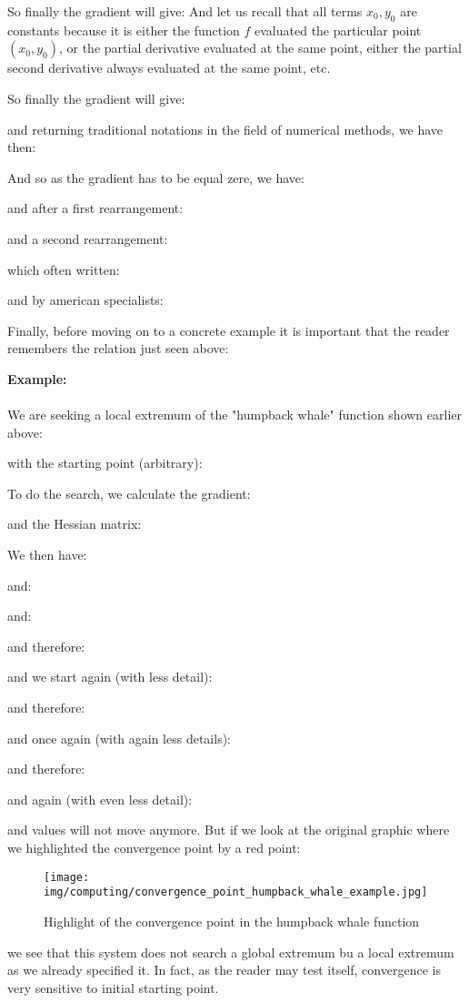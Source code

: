 	So finally the gradient will give:
	And let us recall that all terms $x_0,y_0$ are constants because it is either the function $f$ evaluated the particular point $(x_0,y_0)$, or the partial derivative evaluated at the same point, either the partial second derivative always evaluated at the same point, etc.

	So finally the gradient will give:
	
	and returning traditional notations in the field of numerical methods, we have then:
	
	And so as the gradient has to be equal zere, we have:
	
	and after a first rearrangement:
	
	and a second rearrangement:
	
	which often written:
	
	and by american specialists:
	
	Finally, before moving on to a concrete example it is important that the reader remembers the relation just seen above:
	
	
	\pagebreak
	\begin{tcolorbox}[colframe=black,colback=white,sharp corners]
	\textbf{{\Large {}}Example:}\\\\
	We are seeking a local extremum of the "humpback whale" function shown earlier above:
	
	with the starting point (arbitrary):
	
	To do the search, we calculate the gradient:
	
	and the Hessian matrix:
	
	We then have:
	
	and:
	
	and:
	
	and therefore:
	
	and we start again (with less detail):
	
	\end{tcolorbox}
	
	\pagebreak
	\begin{tcolorbox}[colframe=black,colback=white,sharp corners]
	
	and therefore:
	
	and once again (with again less details):
	
	and therefore:
	
	and again (with even less detail):
	
	and values will not move anymore. But if we look at the original graphic where we highlighted the convergence point by a red point:
	\begin{figure}[H]
		\centering
		\texttt{[image: img/computing/convergence\_point\_humpback\_whale\_example.jpg]}
		\caption[]{Highlight of the convergence point in the humpback whale function}
	\end{figure}
	we see that this system does not search a global extremum bu a local extremum as we already specified it. In fact, as the reader may test itself, convergence is very sensitive to initial starting point.
	\end{tcolorbox}
	
